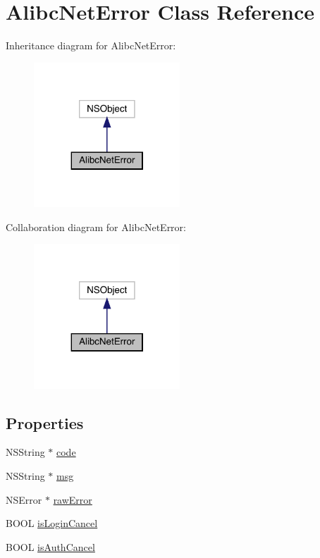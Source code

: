 \hypertarget{interface_alibc_net_error}{}\section{Alibc\+Net\+Error Class Reference}
\label{interface_alibc_net_error}


Inheritance diagram for Alibc\+Net\+Error\+:\nopagebreak
\begin{figure}[H]
\begin{center}
\leavevmode
\includegraphics[width=155pt]{interface_alibc_net_error__inherit__graph}
\end{center}
\end{figure}


Collaboration diagram for Alibc\+Net\+Error\+:\nopagebreak
\begin{figure}[H]
\begin{center}
\leavevmode
\includegraphics[width=155pt]{interface_alibc_net_error__coll__graph}
\end{center}
\end{figure}
\subsection*{Properties}
\begin{DoxyCompactItemize}
\item 
N\+S\+String $\ast$ \mbox{\hyperlink{interface_alibc_net_error_a470523add33123024f559d1b5e0db872}{code}}
\item 
N\+S\+String $\ast$ \mbox{\hyperlink{interface_alibc_net_error_a688102648b2c8820cdb83c77a78616d1}{msg}}
\item 
N\+S\+Error $\ast$ \mbox{\hyperlink{interface_alibc_net_error_a49a120db619546fd50f78e9146cab93a}{raw\+Error}}
\item 
B\+O\+OL \mbox{\hyperlink{interface_alibc_net_error_aca3bdb948f4a4f8a1172b1cc0ecddf98}{is\+Login\+Cancel}}
\item 
B\+O\+OL \mbox{\hyperlink{interface_alibc_net_error_ad4feebce96aec80d1736de9801274ac4}{is\+Auth\+Cancel}}
\end{DoxyCompactItemize}


